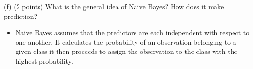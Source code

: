 \documentclass[
]{article}
\begin{document}
\begin{enumerate}
(f) (2 points) What is the general idea of Naive Bayes? How does it make prediction?
\begin{itemize}
\item Naive Bayes assumes that the predictors are each independent with respect to one another. It calculates the probability of an observation belonging to a given class it then proceeds to assign the observation to the class with the highest probability.
\end{itemize}

\end{enumerate}
\end{document}
